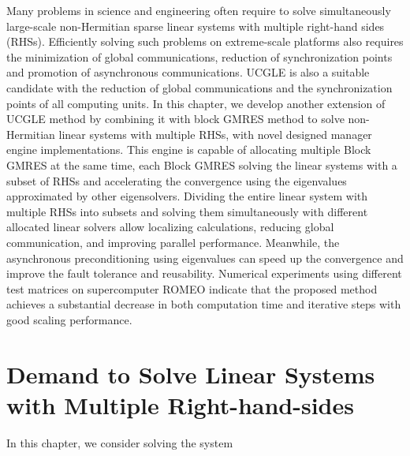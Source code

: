\begin{displayquote}
	\textsf{Many problems in science and engineering often require to solve simultaneously large-scale non-Hermitian sparse linear systems with multiple right-hand sides (RHSs). Efficiently solving such problems on extreme-scale platforms also requires the minimization of global communications, reduction of synchronization points and promotion of asynchronous communications. UCGLE is also a suitable candidate with the reduction of global communications and the synchronization points of all computing units. In this chapter, we develop another extension of UCGLE method by combining it with block GMRES method to solve non-Hermitian linear systems with multiple RHSs, with novel designed manager engine implementations. This engine is capable of allocating multiple Block GMRES at the same time, each Block GMRES solving the linear systems with a subset of RHSs and accelerating the convergence using the eigenvalues approximated by other eigensolvers. Dividing the entire linear system with multiple RHSs into subsets and solving them simultaneously with different allocated linear solvers allow localizing calculations, reducing global communication, and improving parallel performance. Meanwhile, the asynchronous preconditioning using eigenvalues can speed up the convergence and improve the fault tolerance and reusability. Numerical experiments using different test matrices on supercomputer ROMEO indicate that the proposed method achieves a substantial decrease in both computation time and iterative steps with good scaling performance.}
\end{displayquote}

\vspace{0.6in}

\section{Demand to Solve Linear Systems with Multiple Right-hand-sides}

In this chapter, we consider solving the system


